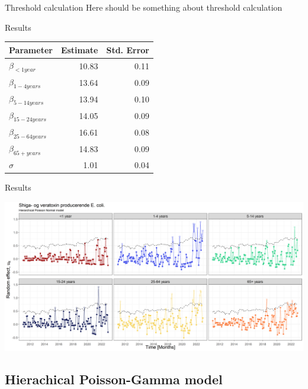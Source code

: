 \documentclass[aspectratio=169]{beamer}
\begin{document}
\begin{frame}{Threshold calculation}
\protect\hypertarget{threshold-calculation}{}
Here should be something about threshold calculation
\end{frame}

\begin{frame}{Results}
\protect\hypertarget{results}{}
\tiny

\begin{table}
\centering\begingroup\fontsize{10}{12}\selectfont

\begin{tabular}{lrr}
\toprule
Parameter & Estimate & Std. Error\\
\midrule
$\beta_{<1 year}$ & 10.83 & 0.11\\
$\beta_{1-4 years}$ & 13.64 & 0.09\\
$\beta_{5-14 years}$ & 13.94 & 0.10\\
$\beta_{15-24 years}$ & 14.05 & 0.09\\
$\beta_{25-64 years}$ & 16.61 & 0.08\\
$\beta_{65+ years}$ & 14.83 & 0.09\\
$\sigma$ & 1.01 & 0.04\\
\bottomrule
\end{tabular}
\endgroup{}
\end{table}

\normalsize
\end{frame}

\begin{frame}{Results}
\protect\hypertarget{results-1}{}
\tiny

\includegraphics[width=1\linewidth]{../figures/windowedSTEDPoisNExclude}

\normalsize
\end{frame}

\hypertarget{hierachical-poisson-gamma-model}{%
\subsection{Hierachical Poisson-Gamma
model}\label{hierachical-poisson-gamma-model}}
\end{document}
